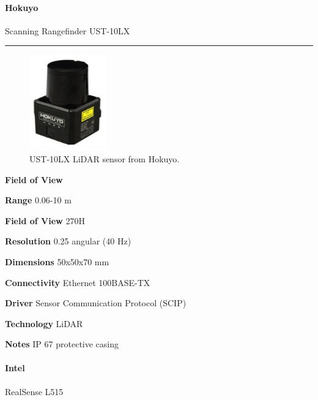 \documentclass[../main.tex]{subfiles}
\begin{document}
\paragraph{\large \textbf{Hokuyo}} {\large Scanning Rangefinder UST-10LX}

\noindent\rule{8cm}{0.1pt}
\begin{figure}[H]
    \centering
    \includegraphics[width=0.3\textwidth]{images/HokuyoUST10LX.png}
    \caption{UST-10LX LiDAR sensor from Hokuyo.}
    \label{fig:HokuyoUST10LX}
\end{figure}
\begin{labeling}{\textbf{Field of View    }}
    \setlength{\itemindent}{2em}
    \item [\textbf{Range}] 0.06-10 m
    \item [\textbf{Field of View}] 270H
    \item [\textbf{Resolution}] 0.25 angular (40 Hz)
    \item [\textbf{Dimensions}] 50x50x70 mm
    \item [\textbf{Connectivity}] Ethernet 100BASE-TX
    \item [\textbf{Driver}] Sensor Communication Protocol (SCIP)
    \item [\textbf{Technology}] LiDAR
    \item [\textbf{Notes}] IP 67 protective casing
\end{labeling}
\vspace{1em}
\paragraph{\large \textbf{Intel}} {\large RealSense L515}
\end{document}
